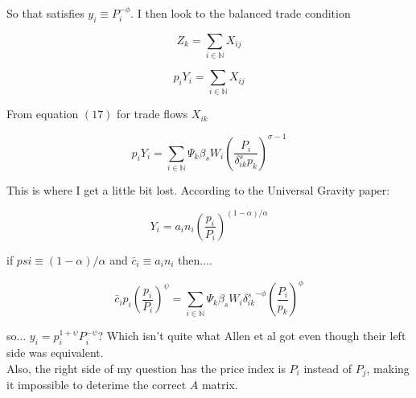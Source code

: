 \documentclass{article}
\begin{document}
So that satisfies $y_i \equiv P_i^{-\phi}$. I then look to the balanced trade condition

\begin{equation*}
Z_k = \sum_{i\in \mathbb{N}}  X_{ij}
\end{equation*}

\begin{equation*}
p_i Y_i = \sum_{i \in \mathbb{N}}  X_{ij}
\end{equation*}

From equation $(17)$ for trade flows $X_{ik}$

\begin{equation*}
p_i Y_i = \sum_{i\in \mathbb{N}}  \Psi_k \beta_s W_i \left(\frac{P_i}{\delta_{ik}^s p_k}\right)^{\sigma-1}
\end{equation*}

This is where I get a little bit lost. According to the Universal Gravity paper:

\begin{equation*}
    Y_i = a_i n_i \left( \frac{p_i}{P_i} \right)^{(1 - \alpha)/\alpha}
\end{equation*}

if $psi \equiv (1 - \alpha)/\alpha$ and $\bar{c}_i \equiv a_i n_i$ then....

\begin{equation*}
\bar{c}_i p_i \left(\frac{p_i}{P_i}\right)^\psi = \sum_{i\in \mathbb{N}}  \Psi_k \beta_s W_i {\delta_{ik}^s}^{-\phi} \left(\frac{P_i}{ p_k}\right)^\phi
\end{equation*}

so... $y_i = p_i^{1+\psi}P_i^{-\psi}$? Which isn't quite what Allen et al got even though their left side was equivalent.\\

Also, the right side of my question has the price index is $P_i$ instead of $P_j$, making it impossible to deterime the correct $A$ matrix.
\end{document}
